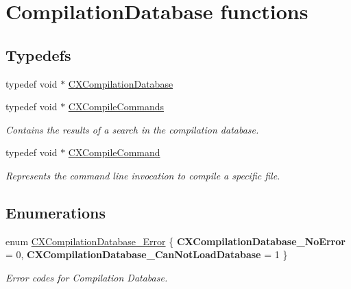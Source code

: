 \hypertarget{group__COMPILATIONDB}{}\section{Compilation\+Database functions}
\label{group__COMPILATIONDB}
\subsection*{Typedefs}
\begin{DoxyCompactItemize}
\item 
typedef void $\ast$ \mbox{\hyperlink{group__COMPILATIONDB_gaecfc6e98d321bc436061472f4e4f84b2}{C\+X\+Compilation\+Database}}
\item 
typedef void $\ast$ \mbox{\hyperlink{group__COMPILATIONDB_gab8bb09eb53b86dbd645dc3ed2b6b7248}{C\+X\+Compile\+Commands}}
\begin{DoxyCompactList}\small\item\em Contains the results of a search in the compilation database. \end{DoxyCompactList}\item 
\mbox{\label{group__COMPILATIONDB_gae59272595ab7fa4c1ed03348c56264bf}} 
typedef void $\ast$ \mbox{\hyperlink{group__COMPILATIONDB_gae59272595ab7fa4c1ed03348c56264bf}{C\+X\+Compile\+Command}}
\begin{DoxyCompactList}\small\item\em Represents the command line invocation to compile a specific file. \end{DoxyCompactList}\end{DoxyCompactItemize}
\subsection*{Enumerations}
\begin{DoxyCompactItemize}
\item 
\mbox{\label{group__COMPILATIONDB_gaf3d54e270b01e34f9db65579014255f8}} 
enum \mbox{\hyperlink{group__COMPILATIONDB_gaf3d54e270b01e34f9db65579014255f8}{C\+X\+Compilation\+Database\+\_\+\+Error}} \{ {\bfseries C\+X\+Compilation\+Database\+\_\+\+No\+Error} = 0, 
{\bfseries C\+X\+Compilation\+Database\+\_\+\+Can\+Not\+Load\+Database} = 1
 \}
\begin{DoxyCompactList}\small\item\em Error codes for Compilation Database. \end{DoxyCompactList}\end{DoxyCompactItemize}
